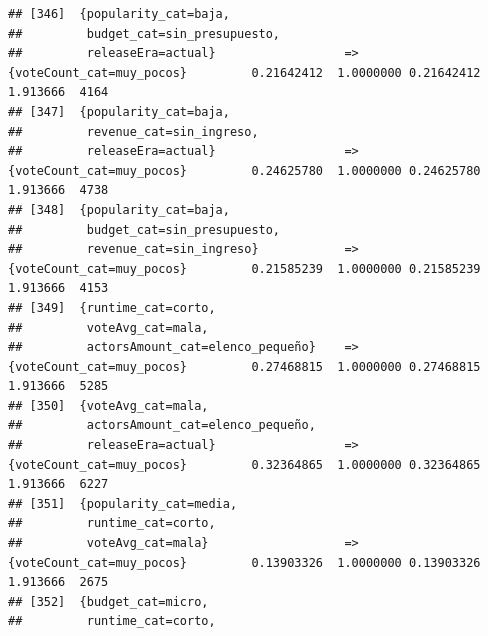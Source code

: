 \documentclass[
]{article}
\begin{document}
\begin{verbatim}
## [346]  {popularity_cat=baja,                                                                                                    
##         budget_cat=sin_presupuesto,                                                                                             
##         releaseEra=actual}                  => {voteCount_cat=muy_pocos}         0.21642412  1.0000000 0.21642412 1.913666  4164
## [347]  {popularity_cat=baja,                                                                                                    
##         revenue_cat=sin_ingreso,                                                                                                
##         releaseEra=actual}                  => {voteCount_cat=muy_pocos}         0.24625780  1.0000000 0.24625780 1.913666  4738
## [348]  {popularity_cat=baja,                                                                                                    
##         budget_cat=sin_presupuesto,                                                                                             
##         revenue_cat=sin_ingreso}            => {voteCount_cat=muy_pocos}         0.21585239  1.0000000 0.21585239 1.913666  4153
## [349]  {runtime_cat=corto,                                                                                                      
##         voteAvg_cat=mala,                                                                                                       
##         actorsAmount_cat=elenco_pequeño}    => {voteCount_cat=muy_pocos}         0.27468815  1.0000000 0.27468815 1.913666  5285
## [350]  {voteAvg_cat=mala,                                                                                                       
##         actorsAmount_cat=elenco_pequeño,                                                                                        
##         releaseEra=actual}                  => {voteCount_cat=muy_pocos}         0.32364865  1.0000000 0.32364865 1.913666  6227
## [351]  {popularity_cat=media,                                                                                                   
##         runtime_cat=corto,                                                                                                      
##         voteAvg_cat=mala}                   => {voteCount_cat=muy_pocos}         0.13903326  1.0000000 0.13903326 1.913666  2675
## [352]  {budget_cat=micro,                                                                                                       
##         runtime_cat=corto,                                                                                                      

\end{verbatim}
\end{document}
